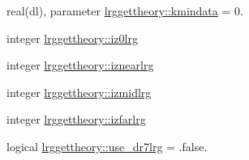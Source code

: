 \begin{DoxyCompactItemize}
real(dl), parameter \mbox{\hyperlink{namespacelrggettheory_a32295c6e11071f61c6311cac0eec283b}{lrggettheory\+::kmindata}} = 0.
\item 
integer \mbox{\hyperlink{namespacelrggettheory_a39a758c0ae68d61dcd4eea5015d41452}{lrggettheory\+::iz0lrg}}
\item 
integer \mbox{\hyperlink{namespacelrggettheory_aa624d661acd194fa705994f91f5ab639}{lrggettheory\+::iznearlrg}}
\item 
integer \mbox{\hyperlink{namespacelrggettheory_ae25e82fd80684bfff1b6eda6a260d2fc}{lrggettheory\+::izmidlrg}}
\item 
integer \mbox{\hyperlink{namespacelrggettheory_aa2ed4be471b8ee09ea67a2cf685a7f08}{lrggettheory\+::izfarlrg}}
\item 
logical \mbox{\hyperlink{namespacelrggettheory_acc2389105d05edd7e5efbf830641adb7}{lrggettheory\+::use\+\_\+dr7lrg}} = .false.
\end{DoxyCompactItemize}
